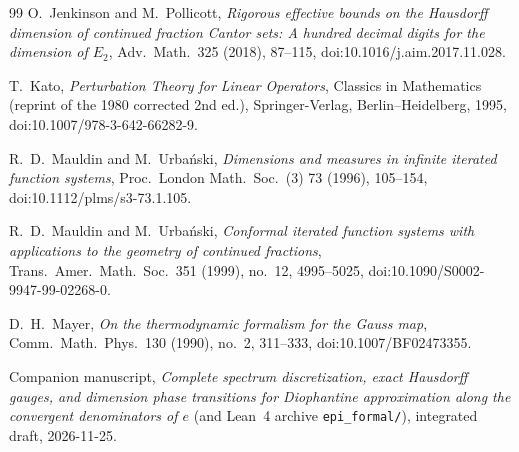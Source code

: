 \documentclass[11pt]{article}
\theoremstyle{definition}
\theoremstyle{remark}
\begin{document}
\begin{thebibliography}{99}
 O.~Jenkinson and M.~Pollicott, \emph{Rigorous effective bounds
on the Hausdorff dimension of continued fraction Cantor sets: A hundred decimal
digits for the dimension of $E_2$}, Adv.\ Math.\ 325 (2018), 87--115,
doi:10.1016/j.aim.2017.11.028.

{\sloppy
{} T.~Kato, \emph{Perturbation Theory for Linear Operators},
Classics in Mathematics (reprint of the 1980 corrected 2nd ed.),
Springer-Verlag, Berlin--Heidelberg, 1995, doi:10.1007/978-3-642-66282-9.
}

{\sloppy
{} R.~D.~Mauldin and M.~Urba\'nski, \emph{Dimensions and measures
in infinite iterated function systems}, Proc.\ London Math.\ Soc.\ (3) 73
(1996), 105--154, doi:10.1112/plms/s3-73.1.105.
}

{\sloppy
{} R.~D.~Mauldin and M.~Urba\'nski, \emph{Conformal iterated
function systems with applications to the geometry of continued fractions},
Trans.\ Amer.\ Math.\ Soc.\ 351 (1999), no.~12, 4995--5025,
doi:10.1090/S0002-9947-99-02268-0.
}

{\sloppy
{} D.~H.~Mayer, \emph{On the thermodynamic formalism for the
Gauss map}, Comm.\ Math.\ Phys.\ 130 (1990), no.~2, 311--333,
doi:10.1007/BF02473355.
}

 Companion manuscript, \emph{Complete spectrum discretization,
exact Hausdorff gauges, and dimension phase transitions for Diophantine
approximation along the convergent denominators of $e$} (and Lean~4 archive
\texttt{epi\_formal/}), integrated draft, 2026-11-25.
\end{thebibliography}
\end{document}
